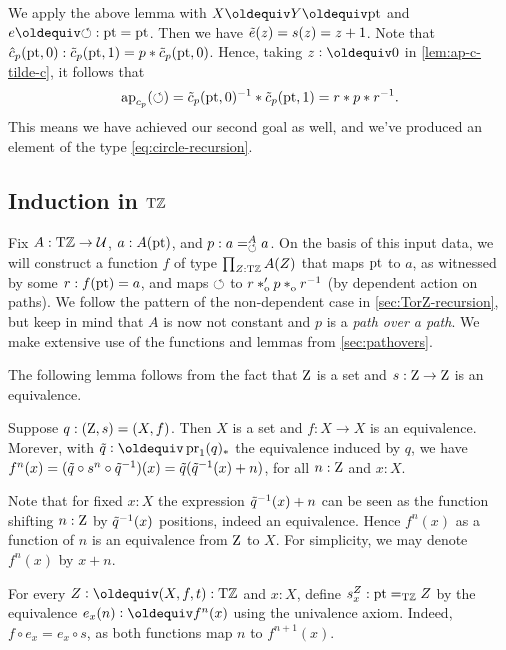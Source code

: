 \documentclass[a4paper,12pt]{amsart}
\begin{document}
We apply the above lemma with $X\jdeq Y\jdeq \pt$ and $e\jdeq{\Zloop}: \pt=\pt$.
Then we have $\tilde {e}(z)=s(z)=z+1$.
Note that $\hat c_p({\mathord{\mathrm{pt}}},0) : \tilde c_p({\mathord{\mathrm{pt}}},1) = p * \tilde c_p({\mathord{\mathrm{pt}}},0)$.
Hence, taking $z\defeq 0$ in \cref{lem:ap-c-tilde-c}, it follows that
\[
  \mathop{{\mathrm{ap}}_{c_p}}({\circlearrowleft}) = \tilde c_p({\mathord{\mathrm{pt}}},0)^{-1} * \tilde c_p({\mathord{\mathrm{pt}}},1)
  = r * p * r^{-1}.
\]
This means we have achieved our second goal as well,
and we've produced an element of the type \eqref{eq:circle-recursion}.

\subsection{Induction in ${\mathrm{T}\mathbb{Z}}$}\label{sec:TorZ-induction}

Fix $A:{\mathrm{T}\mathbb{Z}}\to\mathcal{U}$, $a:A({\mathord{\mathrm{pt}}})$, and $p: a=^A_{{\circlearrowleft}} a$.
On the basis of this input data, we will construct a function $f$ of
type $\prod_{Z:{\mathrm{T}\mathbb{Z}}} A(Z)$ that maps ${\mathord{\mathrm{pt}}}$ to $a$,
as witnessed by some $r : f({\mathord{\mathrm{pt}}}) = a$,
and maps ${\circlearrowleft}$ to $r \ctop p \cto r^{-1}$ (by dependent action on paths).
We follow the pattern of the non-dependent case
in \cref{sec:TorZ-recursion}, but keep in mind that
$A$ is now not constant and $p$ is a \emph{path over a path}.
{We make extensive use of the functions and lemmas from \cref{sec:pathovers}.}

The following lemma follows from the fact that $\mathrm{Z}$ is a set
and $s: \mathrm{Z}\to\mathrm{Z}$ is an equivalence.

\begin{lemma}\label{lem:paths-in-TorZ}
  Suppose $q : (\mathrm{Z},s)=(X,f)$.  Then $X$ is a set and $f: X\to X$ is an equivalence.
  Morever, with $\ptoe{q}\defeq \pr_1(q)_*$ the equivalence induced by $q$, we have
  $f^n(x) = (\tilde {q}\circ s^n \circ \tilde {q}^{-1})(x) = \tilde {q}(\tilde {q}^{-1}(x)+n)$,
  for all $n:\mathrm{Z}$ and $x:X$.
\end{lemma}

Note that for fixed $x:X$ the expression $\tilde {q}^{-1}(x)+n$ can be seen as
the function shifting $n:\mathrm{Z}$ by $\tilde {q}^{-1}(x)$ positions, indeed an equivalence.
Hence $f^n(x)$ as a function of $n$ is an equivalence from $\mathrm{Z}$ to $X$.
For simplicity, we may denote $f^n(x)$ by $x+n$.

\begin{definition}\label{def:loop-s-iterated}
  For every $Z\defeq(X,f,t):\TorZ$ and $x:X$,
  define $s^Z_x: {\mathord{\mathrm{pt}}} =_{\mathrm{T}\mathbb{Z}} Z$ by the equivalence
  $e_x(n)\defeq f^n(x)$ using the univalence axiom. Indeed,
  $f\circ e_x = e_x \circ s$, as both functions map $n$ to $f^{n+1}(x)$.
\end{definition}
\end{document}
